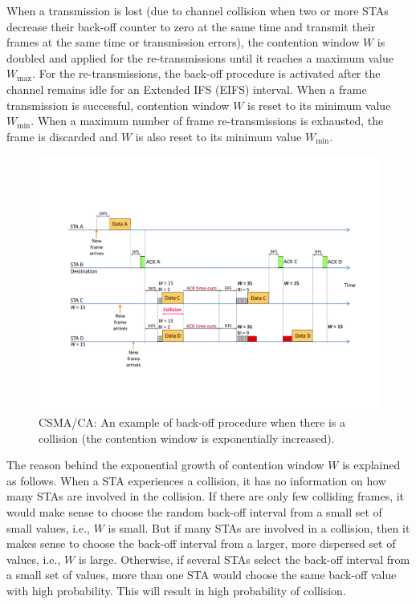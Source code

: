 When a transmission is lost (due to channel collision when two or more STAs decrease their back-off counter to zero at the same time and transmit their frames at the same time or transmission errors), the contention window $W$ is doubled and applied for the re-transmissions until it reaches a maximum value $W_{\max}$. For the re-transmissions, the back-off procedure is activated after the channel remains idle for an Extended IFS (EIFS) interval. When a frame transmission is successful, contention window $W$ is reset to its minimum value $W_{\min}$. When a maximum number of frame re-transmissions is exhausted, the frame is discarded and $W$ is also reset to its minimum value $W_{\min}$.

\begin{figure}[!t]
	\centering
	\includegraphics[width=1.0\columnwidth]{figures2/CSMA-CA-back-off-with-collision}
	\caption{CSMA/CA: An example of back-off procedure when there is a collision (the contention window is exponentially increased).}
	\label{figs:CSMA-CA-back-off-with-collision}
\end{figure}

The reason behind the exponential growth of contention window $W$ is explained as follows. When a STA experiences a collision, it has no information on how many STAs are involved in the collision. If there are only few colliding frames, it would make sense to choose the random back-off interval from a small set of small values, i.e., $W$ is small. But if many STAs are involved in a collision, then it makes sense to choose the back-off interval from a larger, more dispersed set of values, i.e., $W$ is large. Otherwise, if several STAs select the back-off interval from a small set of values, more than one STA would choose the same back-off value with high probability. This will result in high probability of collision.

